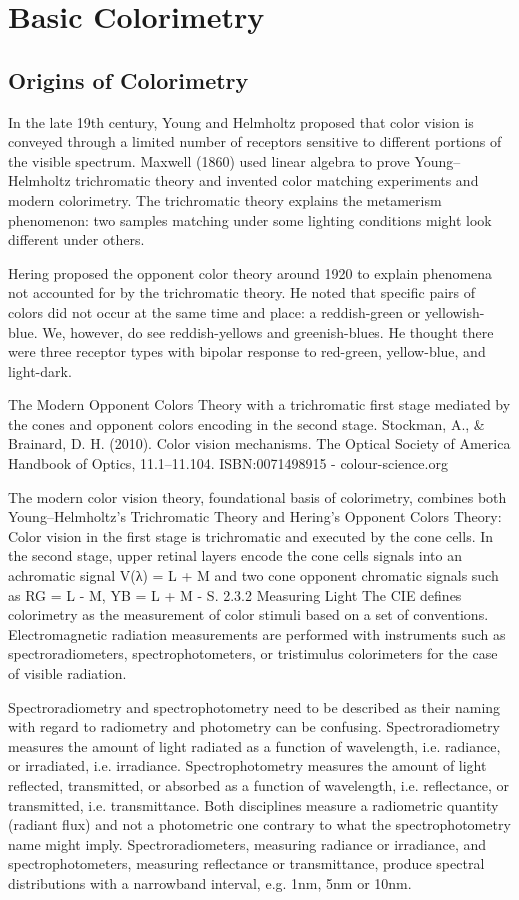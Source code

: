 \section{Basic Colorimetry}

\subsection{Origins of Colorimetry}

In the late 19th century, Young and Helmholtz proposed that color vision is conveyed through a limited number of receptors sensitive to different portions of the visible spectrum. Maxwell (1860) used linear algebra to prove Young–Helmholtz trichromatic theory and invented color matching experiments and modern colorimetry. The trichromatic theory explains the metamerism phenomenon: two samples matching under some lighting conditions might look different under others.


Hering proposed the opponent color theory around 1920 to explain phenomena not accounted for by the trichromatic theory. He noted that specific pairs of colors did not occur at the same time and place: a reddish-green or yellowish-blue. We, however, do see reddish-yellows and greenish-blues. He thought there were three receptor types with bipolar response to red-green, yellow-blue, and light-dark.

The Modern Opponent Colors Theory with a trichromatic first stage mediated by the cones and opponent colors encoding in the second stage. Stockman, A., & Brainard, D. H. (2010). Color vision mechanisms. The Optical Society of America Handbook of Optics, 11.1–11.104. ISBN:0071498915 - colour-science.org

The modern color vision theory,  foundational basis of colorimetry, combines both Young–Helmholtz's Trichromatic Theory and Hering’s Opponent Colors Theory: Color vision in the first stage is trichromatic and executed by the cone cells. In the second stage, upper retinal layers encode the cone cells signals into an achromatic signal V(λ) = L + M and two cone opponent chromatic signals such as RG = L - M, YB = L + M - S.
2.3.2 Measuring Light
The CIE defines colorimetry as the measurement of color stimuli based on a set of conventions. Electromagnetic radiation measurements are performed with instruments such as spectroradiometers, spectrophotometers, or tristimulus colorimeters for the case of visible radiation.

Spectroradiometry and spectrophotometry need to be described as their naming with regard to radiometry and photometry can be confusing.
Spectroradiometry measures the amount of light radiated as a function of wavelength, i.e. radiance, or irradiated, i.e. irradiance.
Spectrophotometry measures the amount of light reflected, transmitted, or absorbed as a function of wavelength, i.e. reflectance, or transmitted, i.e. transmittance.
Both disciplines measure a radiometric quantity (radiant flux) and not a photometric one contrary to what the spectrophotometry name might imply. Spectroradiometers, measuring radiance or irradiance, and spectrophotometers, measuring reflectance or transmittance, produce spectral distributions with a narrowband interval, e.g. 1nm, 5nm or 10nm.

